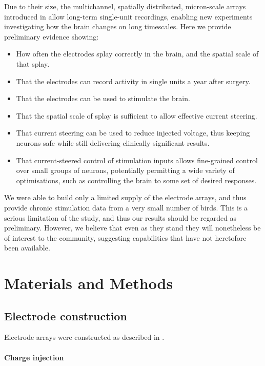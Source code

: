 \documentclass[10pt,letterpaper]{article}
\renewcommand{\subsubsection}[1]{\paragraph{#1}}
\begin{document}
Due to their size, the multichannel, spatially distributed,
micron-scale arrays introduced in \cite{Guitchounts2013electrode}
allow long-term single-unit recordings, enabling new experiments
investigating how the brain changes on long timescales. Here we
provide preliminary evidence showing:
\begin{itemize}
\item How often the electrodes splay correctly in the brain, and the spatial scale of that splay.
\item That the electrodes can record activity in single units a year after surgery.
\item That the electrodes can be used to stimulate the brain.
\item That the spatial scale of splay is sufficient to allow effective current steering.
  \item That current steering can be used to reduce injected voltage, thus keeping neurons safe while still delivering clinically significant results.
\item That current-steered control of stimulation inputs allows
fine-grained control over small groups of neurons, potentially
permitting a wide variety of optimisations, such as controlling the
brain to some set of desired responses.
\end{itemize}

We were able to build only a limited supply of the electrode arrays, and
thus provide chronic stimulation data from a very small number of
birds. This is a serious limitation of the study, and thus our results
should be regarded as preliminary. However, we believe that even as
they stand they will nonetheless be of interest to the community,
suggesting capabilities that have not heretofore been available.




\section{Materials and Methods}

\subsection{Electrode construction}

Electrode arrays were constructed as described in
\cite{Guitchounts2013electrode}.

\subsubsection{Charge injection}
\end{document}
